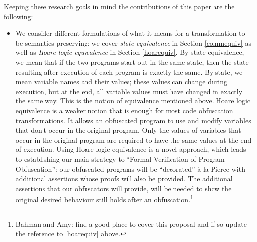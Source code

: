 \documentclass[compsoc,conference,a4paper,10pt,times]{IEEEtran}
\begin{document}
  
Keeping these research goals in mind the contributions of this paper are the following:
\begin{itemize}
    \item We consider different formulations of what it means for a transformation to be semantics-preserving: we cover \emph{state equivalence} in Section \ref{commequiv} as well as \emph{Hoare logic equivalence} in Section \ref{hoarequiv}. By state equivalence, we mean that if the two programs start out in the same state, then the state resulting after execution of each program is exactly the same.  By state, we mean variable names and their values; these values can change during execution, but at the end, all variable values must have changed in exactly the same way.  This is the notion of equivalence mentioned above. Hoare logic equivalence is a weaker notion that is enough for most code obfuscation transformations. It allows an obfuscated program to use and modify variables that don't occur in the original program.  Only the values of variables that occur in the original program are required to have the same values at the end of execution.  Using Hoare logic equivalence is a novel approach, which leads to establishing our main strategy to ``Formal Verification of Program Obfuscation'': our obfuscated programs will be ``decorated''  \`a la  Pierce \cite{SFV2} with additional assertions whose proofs will also be provided\label{itm:1}. The additional assertions that our obfuscators will provide, will be needed to show the original desired behaviour still holds after an obfuscation.\footnote{Bahman and Amy: find a good place to cover this proposal and if so update the reference to \ref{hoarequiv} above.}
    

\end{itemize}
\end{document}
